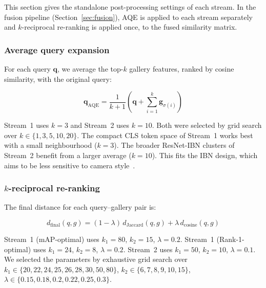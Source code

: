 This section gives the standalone post-processing settings of each stream. In the fusion pipeline (Section~\ref{sec:fusion}), AQE is applied to each stream separately and $k$-reciprocal re-ranking is applied once, to the fused similarity matrix.

\subsubsection{Average query expansion}
For each query $\mathbf{q}$, we average the top-$k$ gallery features, ranked by cosine similarity, with the original query:

\begin{equation}
  \mathbf{q}_{\mathrm{AQE}} =
    \frac{1}{k{+}1}\!\left(\mathbf{q} + \sum_{i=1}^{k} \mathbf{g}_{\sigma(i)}\right)
  \label{eq:aqe}
\end{equation}

Stream~1 uses $k{=}3$ and Stream~2 uses $k{=}10$. Both were selected by grid search over $k\in\{1,3,5,10,20\}$. The compact CLS token space of Stream~1 works best with a small neighbourhood ($k{=}3$). The broader ResNet-IBN clusters of Stream~2 benefit from a larger average ($k{=}10$). This fits the IBN design, which aims to be less sensitive to camera style~\cite{pan2018ibn}.

\subsubsection{$k$-reciprocal re-ranking}
The final distance for each query--gallery pair is:

\begin{equation}
  d_{\mathrm{final}}(q,g) =
    (1{-}\lambda)\,d_{\mathrm{Jaccard}}(q,g)
    + \lambda\,d_{\mathrm{cosine}}(q,g)
  \label{eq:rerank}
\end{equation}

Stream~1 (mAP-optimal) uses $k_1{=}80$, $k_2{=}15$, $\lambda{=}0.2$. Stream~1 (Rank-1-optimal) uses $k_1{=}24$, $k_2{=}8$, $\lambda{=}0.2$. Stream~2 uses $k_1{=}50$, $k_2{=}10$, $\lambda{=}0.1$. We selected the parameters by exhaustive grid search over $k_1\in\{20,\allowbreak 22,\allowbreak 24,\allowbreak 25,\allowbreak 26,\allowbreak 28,\allowbreak 30,\allowbreak 50,\allowbreak 80\}$, $k_2\in\{6,\allowbreak 7,\allowbreak 8,\allowbreak 9,\allowbreak 10,\allowbreak 15\}$, $\lambda\in\{0.15,\allowbreak 0.18,\allowbreak 0.2,\allowbreak 0.22,\allowbreak 0.25,\allowbreak 0.3\}$.

